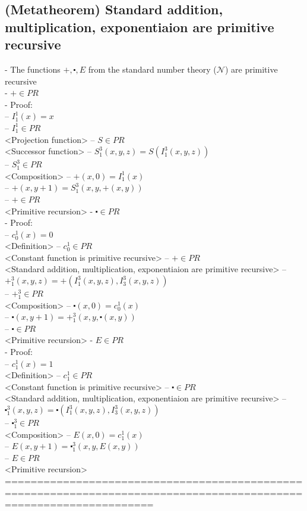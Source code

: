 \documentclass{book}
\begin{document}
\subsection{(Metatheorem) Standard addition, multiplication, exponentiaion are primitive recursive} %
	- The functions $+, \centerdot, E$ from the standard number theory ($\mathcal{N}$) are primitive recursive \\
	- $+ \in PR$ \\
	- Proof: \\
		-- $I_1^1(x) = x$ \\
		-- $I_1^1 \in PR$ \\ <Projection function>
		-- $S \in PR$ \\ <Successor function>
		-- $S_1^3(x, y, z) = S(I_1^3(x, y, z))$ \\
		-- $S_1^3 \in PR$ \\ <Composition>
		-- $+(x, 0) = I_1^1(x)$ \\
		-- $+(x, y+1) = S_1^3(x, y, +(x, y))$ \\
		-- $+ \in PR$ \\ <Primitive recursion>
	- $\centerdot \in PR$ \\
	- Proof: \\
		-- $c_0^1(x) = 0$ \\ <Definition>
		-- $c_0^1 \in PR$ \\ <Constant function is primitive recursive>
		-- $+ \in PR$ \\ <Standard addition, multiplication, exponentiaion are primitive recursive>
		-- $+_1^3(x, y, z) = +(I_1^3(x, y, z), I_3^3(x, y, z))$ \\
		-- $+_1^3 \in PR$ \\ <Composition>
		-- $\centerdot(x, 0) = c_0^1(x)$ \\
		-- $\centerdot(x, y+1) = +_1^3(x, y, \centerdot(x, y))$ \\
		-- $\centerdot \in PR$ \\ <Primitive recursion>
	- $E \in PR$ \\
	- Proof: \\
		-- $c_1^1(x) = 1$ \\ <Definition>
		-- $c_1^1 \in PR$ \\ <Constant function is primitive recursive>
		-- $\centerdot \in PR$ \\ <Standard addition, multiplication, exponentiaion are primitive recursive>
		-- $\centerdot_1^3(x, y, z) = \centerdot(I_1^3(x, y, z), I_3^3(x, y, z))$ \\
		-- $\centerdot_1^3 \in PR$ \\ <Composition>
		-- $E(x, 0) = c_1^1(x)$ \\
		-- $E(x, y+1) = \centerdot_1^3(x, y, E(x, y))$ \\
		-- $E \in PR$ \\ <Primitive recursion>
	===================================================================================================================
\end{document}
